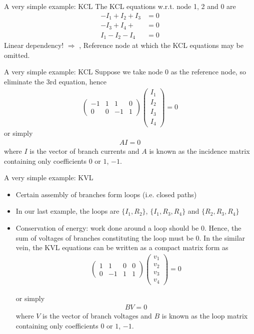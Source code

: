 \documentclass[xcolor=dvipsnames]{beamer}
\begin{document}
\begin{frame}{A very simple example: KCL}
	The KCL equations w.r.t. node 1, 2 and 0 are
	\begin{align*}
		-I_1 + I_2 + I_3 &= 0\\
		-I_3 + I_4 + \,\, &= 0\\
		I_1 - I_2 - I_4 &=0
	\end{align*}
Linear dependency! $\Longrightarrow\,\,$, Reference node at which the KCL equations may be omitted.
\end{frame}

\begin{frame}{A very simple example: KCL}
Suppose we take node 0 as the reference node, so eliminate the 3rd equation, hence
\begin{align*}
	\begin{pmatrix} -1 & 1 & 1 & 0\\ 0 & 0 & -1 & 1 \end{pmatrix}
	\begin{pmatrix} I_1\\ I_2 \\I_3 \\I_4  \end{pmatrix} =0
\end{align*}
or simply
\begin{align*}
	A I = 0
\end{align*}
where $I$ is the vector of branch currents and $A$ is known as the {\color{purple}incidence matrix} containing only coefficients $0$ or $1$, $-1$.
\end{frame}

\begin{frame}{A very simple example: KVL}
\begin{itemize}
	\item Certain assembly of branches form loops (i.e. closed paths)
	\item In our last example, the loops are $\{I_1, R_2\}$, $\{I_1, R_3, R_4\}$ and $\{R_2, R_3, R_4\}$
	\item Conservation of energy: work done around a loop should be 0. Hence, the sum of voltages of branches constituting the loop must be 0.
In the similar vein, the KVL equations can be written as a compact matrix form as
\begin{align*}
	\begin{pmatrix} 1 & 1 & 0 & 0\\ 0 & -1 & 1 & 1 \end{pmatrix}
	\begin{pmatrix} v_1\\ v_2 \\v_3 \\v_4  \end{pmatrix} =0
\end{align*}

or simply
\begin{align*}
	B V = 0
\end{align*}
where $V$ is the vector of branch voltages and $B$ is known as the {\color{purple}loop matrix} containing only coefficients $0$ or $1$, $-1$.
\end{itemize}
\end{frame}
\end{document}
